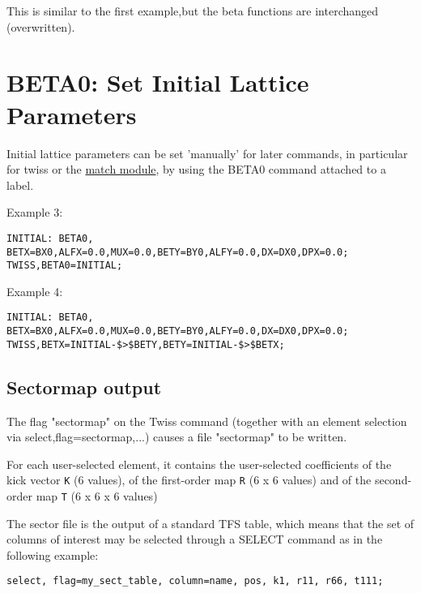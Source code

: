 This is similar to the first example,but the beta functions are interchanged (overwritten).  

\section{BETA0: Set Initial Lattice Parameters}

Initial lattice parameters can be set 'manually' for later commands, in
particular for twiss or the \href{../match/match.html}{match module}, by
using the BETA0 command attached to a label.  

Example 3: 
\begin{verbatim}
INITIAL: BETA0, BETX=BX0,ALFX=0.0,MUX=0.0,BETY=BY0,ALFY=0.0,DX=DX0,DPX=0.0;
TWISS,BETA0=INITIAL;
\end{verbatim}

Example 4: 
\begin{verbatim}
INITIAL: BETA0, BETX=BX0,ALFX=0.0,MUX=0.0,BETY=BY0,ALFY=0.0,DX=DX0,DPX=0.0;
TWISS,BETX=INITIAL-$>$BETY,BETY=INITIAL-$>$BETX;
\end{verbatim}



%
\subsection{Sectormap output}
\label{subsec:sectormap}

The flag "sectormap" on the Twiss command (together with an element
selection via select,flag=sectormap,...) causes a file "sectormap" to be
written.   

For each user-selected element, it contains the user-selected coefficients of the kick vector 
\texttt{K} (6 values), of the first-order map 
\texttt{R} (6 x 6 values) and of the second-order map 
\texttt{T} (6 x 6 x 6 values)

The sector file is the output of a standard TFS table, which means that
the set of columns of interest may be selected through a SELECT command
as in the following example:  


\begin{verbatim}
select, flag=my_sect_table, column=name, pos, k1, r11, r66, t111;
\end{verbatim}


